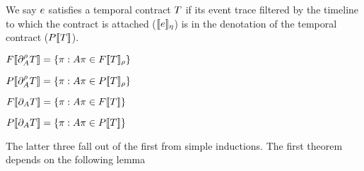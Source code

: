 
%
We say $e$ satisfies a temporal contract $T$ if its event trace filtered by the timeline to which the contract is attached ($[\![ e ]\!]_\eta$) is in the denotation of the temporal contract ($P[\![ T ]\!]$).
%

\begin{theorem}[Full]
 $F[\![ \partial_{A}^{\rho}{T} ]\!] = \left\{\pi : A\pi \in F[\![ T ]\!]_{\rho}\right\}$
\end{theorem}

\begin{theorem}[Partial]
 $P[\![ \partial_{A}^{\rho}{T} ]\!] = \left\{\pi : A\pi \in P[\![ T ]\!]_{\rho}\right\}$
\end{theorem}

\begin{theorem}
 $F[\![ \partial_{A}{T} ]\!] = \left\{\pi : A\pi \in F[\![ T ]\!]\right\}$
\end{theorem}

\begin{theorem}
 $P[\![ \partial_{A}{T} ]\!] = \left\{\pi : A\pi \in P[\![ T ]\!]\right\}$
\end{theorem}

The latter three fall out of the first from simple inductions.
%
The first theorem depends on the following lemma

